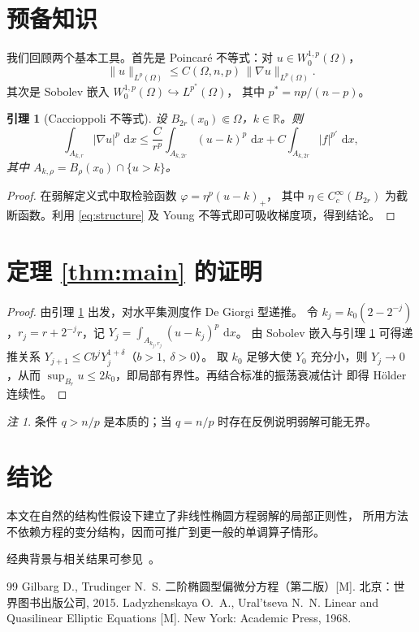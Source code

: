 \documentclass[12pt,a4paper,UTF8,fontset=fandol]{ctexart}
\newtheorem{lemma}[theorem]{引理}
\theoremstyle{definition}
\theoremstyle{remark}
\newtheorem{remark}[theorem]{注}
\newcommand{\R}{\mathbb{R}}
\newcommand{\Om}{\Omega}
\newcommand{\dd}{\,\mathrm{d}}
\begin{document}
\section{预备知识}

我们回顾两个基本工具。首先是 Poincaré 不等式：对 $u\in W^{1,p}_0(\Om)$，
\begin{equation}\label{eq:poincare}
  \|u\|_{L^p(\Om)} \le C(\Om,n,p)\,\|\nabla u\|_{L^p(\Om)} .
\end{equation}
其次是 Sobolev 嵌入 $W^{1,p}_0(\Om)\hookrightarrow L^{p^*}(\Om)$，
其中 $p^*=np/(n-p)$。

\begin{lemma}[Caccioppoli 不等式]\label{lem:cacc}
设 $B_{2r}(x_0)\Subset\Om$，$k\in\R$。则
\begin{equation}
  \int_{A_{k,r}}|\nabla u|^p\,\dd x
  \le \frac{C}{r^p}\int_{A_{k,2r}}(u-k)^p\,\dd x
      + C\int_{A_{k,2r}}|f|^{p'}\,\dd x ,
\end{equation}
其中 $A_{k,\rho}=B_\rho(x_0)\cap\{u>k\}$。
\end{lemma}

\begin{proof}
在弱解定义式中取检验函数 $\varphi=\eta^p(u-k)_+$，
其中 $\eta\in C_c^\infty(B_{2r})$ 为截断函数。利用 \eqref{eq:structure}
及 Young 不等式即可吸收梯度项，得到结论。
\end{proof}

\section{定理 \ref{thm:main} 的证明}

\begin{proof}
由引理 \ref{lem:cacc} 出发，对水平集测度作 De Giorgi 型递推。
令 $k_j=k_0(2-2^{-j})$，$r_j=r+2^{-j}r$，记
$Y_j=\int_{A_{k_j,r_j}}(u-k_j)^p\,\dd x$。
由 Sobolev 嵌入与引理 \ref{lem:cacc} 可得递推关系
$Y_{j+1}\le C b^j Y_j^{1+\delta}$（$b>1,\ \delta>0$）。
取 $k_0$ 足够大使 $Y_0$ 充分小，则 $Y_j\to0$，从而
$\sup_{B_r}u\le 2k_0$，即局部有界性。再结合标准的振荡衰减估计
即得 Hölder 连续性。
\end{proof}

\begin{remark}
条件 $q>n/p$ 是本质的；当 $q=n/p$ 时存在反例说明弱解可能无界。
\end{remark}

\section{结论}

本文在自然的结构性假设下建立了非线性椭圆方程弱解的局部正则性，
所用方法不依赖方程的变分结构，因而可推广到更一般的单调算子情形。

\bigskip
经典背景与相关结果可参见~\cite{GT,LU}。

\begin{thebibliography}{99}
 Gilbarg D., Trudinger N.~S. 二阶椭圆型偏微分方程（第二版）[M].
北京：世界图书出版公司, 2015.
 Ladyzhenskaya O.~A., Ural'tseva N.~N. Linear and Quasilinear
Elliptic Equations [M]. New York: Academic Press, 1968.
\end{thebibliography}
\end{document}
